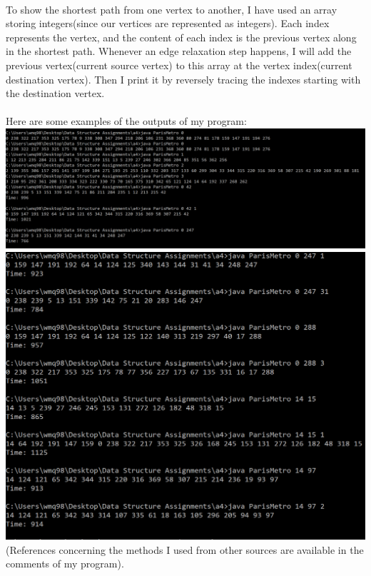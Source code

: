 \documentclass[11pt]{article}
\begin{document}
\\
To show the shortest path from one vertex to another, I have used an array storing integers(since our vertices are represented as integers). Each index represents the vertex, and the content of each index is the previous vertex along in the shortest path. Whenever an edge relaxation step happens, I will add the previous vertex(current source vertex) to this array at the vertex index(current destination vertex). Then I print it by reversely tracing the indexes starting with the destination vertex.\\
\\
Here are some examples of the outputs of my program:\\
\includegraphics[scale=.5]{Screenshot1.png}\\
\includegraphics[scale=.5]{Screenshot2.png}\\
(References concerning the methods I used from other sources are available in the comments of my program).
\end{document}
